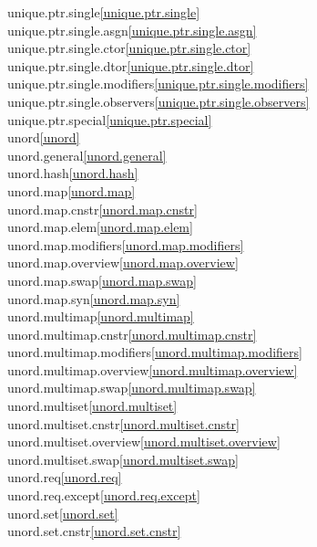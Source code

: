 \begin{multicols}{2}
unique.ptr.single\quad\ref{unique.ptr.single}\\
unique.ptr.single.asgn\quad\ref{unique.ptr.single.asgn}\\
unique.ptr.single.ctor\quad\ref{unique.ptr.single.ctor}\\
unique.ptr.single.dtor\quad\ref{unique.ptr.single.dtor}\\
unique.ptr.single.modifiers\quad\ref{unique.ptr.single.modifiers}\\
unique.ptr.single.observers\quad\ref{unique.ptr.single.observers}\\
unique.ptr.special\quad\ref{unique.ptr.special}\\
unord\quad\ref{unord}\\
unord.general\quad\ref{unord.general}\\
unord.hash\quad\ref{unord.hash}\\
unord.map\quad\ref{unord.map}\\
unord.map.cnstr\quad\ref{unord.map.cnstr}\\
unord.map.elem\quad\ref{unord.map.elem}\\
unord.map.modifiers\quad\ref{unord.map.modifiers}\\
unord.map.overview\quad\ref{unord.map.overview}\\
unord.map.swap\quad\ref{unord.map.swap}\\
unord.map.syn\quad\ref{unord.map.syn}\\
unord.multimap\quad\ref{unord.multimap}\\
unord.multimap.cnstr\quad\ref{unord.multimap.cnstr}\\
unord.multimap.modifiers\quad\ref{unord.multimap.modifiers}\\
unord.multimap.overview\quad\ref{unord.multimap.overview}\\
unord.multimap.swap\quad\ref{unord.multimap.swap}\\
unord.multiset\quad\ref{unord.multiset}\\
unord.multiset.cnstr\quad\ref{unord.multiset.cnstr}\\
unord.multiset.overview\quad\ref{unord.multiset.overview}\\
unord.multiset.swap\quad\ref{unord.multiset.swap}\\
unord.req\quad\ref{unord.req}\\
unord.req.except\quad\ref{unord.req.except}\\
unord.set\quad\ref{unord.set}\\
unord.set.cnstr\quad\ref{unord.set.cnstr}\\

\end{multicols}
